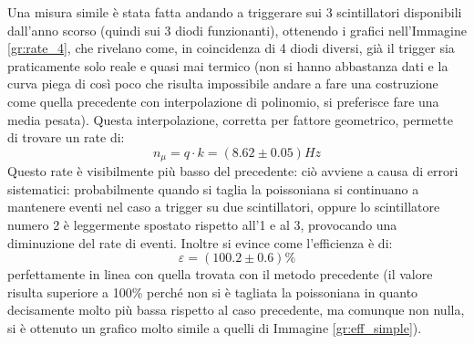 Una misura simile è stata fatta andando a triggerare sui 3 scintillatori disponibili dall'anno scorso (quindi sui 3 diodi funzionanti), ottenendo i grafici nell'Immagine \ref{gr:rate_4}, che rivelano come, in coincidenza di 4 diodi diversi, già il trigger sia praticamente solo reale e quasi mai termico (non si hanno abbastanza dati e la curva piega di così poco che risulta impossibile andare a fare una costruzione come quella precedente con interpolazione di polinomio, si preferisce fare una media pesata). Questa interpolazione, corretta per fattore geometrico, permette di trovare un rate di:
\begin{equation}
  n_\mu = q \cdot k = (8.62 \pm 0.05) Hz
\end{equation}
Questo rate è visibilmente più basso del precedente: ciò avviene a causa di errori sistematici: probabilmente quando si taglia la poissoniana si continuano a mantenere eventi nel caso a trigger su due scintillatori, oppure lo scintillatore numero 2 è leggermente spostato rispetto all'1 e al 3, provocando una diminuzione del rate di eventi.
Inoltre si evince come l'efficienza è di:
\begin{equation}
  \varepsilon = (100.2 \pm 0.6)\%
\end{equation}
perfettamente in linea con quella trovata con il metodo precedente (il valore risulta superiore a 100\% perché non si è tagliata la poissoniana in quanto decisamente molto più bassa rispetto al caso precedente, ma comunque non nulla, si \`e ottenuto un grafico molto simile a quelli di Immagine \ref{gr:eff_simple}).


